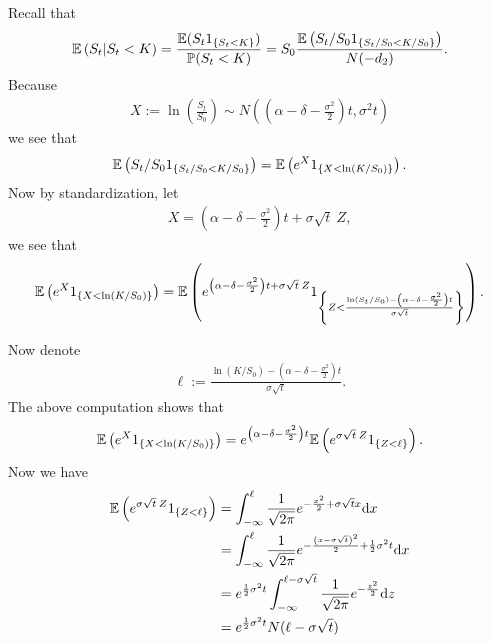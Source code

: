 \begin{frame}[fragile,t]
\begin{myproof}
Recall that
\begin{align*}
	\mathbb{E}\left(S_t|S_t<K\right) = \frac{\mathbb{E}(S_t 1_{\{S_t<K\} })}{\mathbb{P}(S_t<K)} = S_0 \frac{\mathbb{E}\left(S_t/S_0 1_{\{S_t /S_0<K /S_0\} }\right)}{N(-d_2)}.
\end{align*}
Because
\begin{align*}
	X:=\ln\left(\frac{S_t}{S_0}\right) \sim N\left((\alpha-\delta-\frac{\sigma^2}{2})t,\sigma^2 t\right)
\end{align*}
we see that
\begin{align*}
	\mathbb{E}\left(S_t/S_0 1_{\{S_t /S_0<K /S_0\} }\right) = \mathbb{E}\left(e^X 1_{\{X< \ln\left(K/S_0\right) \} }\right).
\end{align*}
Now by standardization, let
\begin{align*}
	X = \left(\alpha-\delta-\frac{\sigma^2}{2}\right) t + \sigma \sqrt{t}\: Z,
\end{align*}
we see that
\begin{align*}
	\mathbb{E}\left(e^X 1_{\{X< \ln\left(K/S_0\right) \} }\right)
	=\mathbb{E}\left(e^{\left(\alpha-\delta-\frac{\sigma^2}{2}\right) t + \sigma \sqrt{t}\:
	Z}1_{\left\{Z<\frac{\ln(S_t /S_0)-\left(\alpha-\delta-\frac{\sigma^2}{2}\right) t}{\sigma \sqrt{t}}\right\} }\right).
\end{align*}
\end{myproof}
\end{frame}
\begin{frame}[fragile,t]
\begin{myproof}[ (continued)]
Now denote
\begin{align*}
	\ell := \frac{\ln(K/S_0)-\left(\alpha-\delta-\frac{\sigma^2}{2}\right) t}{\sigma \sqrt{t}}.
\end{align*}
The above computation shows that
\begin{align*}
	\mathbb{E}\left(e^X 1_{\left\{X< \ln\left(K/S_0\right) \right\} }\right)
	=e^{\left(\alpha-\delta-\frac{\sigma^2}{2}\right) t}
	\mathbb{E}\left(e^{\sigma \sqrt{t}\: Z}1_{\left\{Z<\ell\right\} }\right).
\end{align*}
Now we have
\begin{align*}
		\mathbb{E}\left(e^{\sigma \sqrt{t}\: Z}1_{\left\{Z<\ell\right\} }\right)
    & =\int_{-\infty}^\ell \frac{1}{\sqrt{2\pi}}e^{-\frac{x^2}{2} + \sigma \sqrt{t} x} \mathrm{d} x                                  \\
    & =\int_{-\infty}^\ell \frac{1}{\sqrt{2\pi}}e^{-\frac{\left(x-\sigma \sqrt{t}\right)^2}{2} + \frac{1}{2}\sigma^2 t} \mathrm{d} x \\
    & =e^{\frac{1}{2}\sigma^2 t}\int_{-\infty}^{\ell -\sigma \sqrt{t}} \frac{1}{\sqrt{2\pi}}e^{-\frac{z^2}{2} } \mathrm{d} z         \\
    & =e^{\frac{1}{2}\sigma^2 t} N(\ell -\sigma \sqrt{t})
\end{align*}
\end{myproof}
\end{frame}
